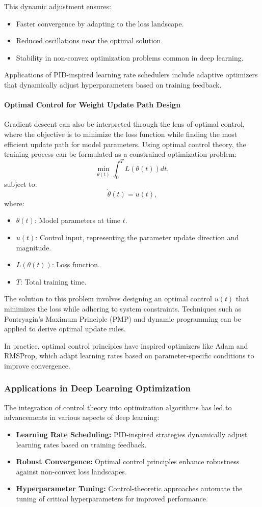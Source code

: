 \documentclass{IEEEojcsys}
\begin{document}
This dynamic adjustment ensures:
\begin{itemize}
    \item Faster convergence by adapting to the loss landscape.
    \item Reduced oscillations near the optimal solution.
    \item Stability in non-convex optimization problems common in deep learning.
\end{itemize}

Applications of PID-inspired learning rate schedulers include adaptive optimizers that dynamically adjust hyperparameters based on training feedback.

\paragraph{Optimal Control for Weight Update Path Design}
Gradient descent can also be interpreted through the lens of optimal control, where the objective is to minimize the loss function while finding the most efficient update path for model parameters. Using optimal control theory, the training process can be formulated as a constrained optimization problem:
\[
\min_{\theta(t)} \int_0^T L(\theta(t)) dt,
\]
subject to:
\[
\dot{\theta}(t) = u(t),
\]
where:
\begin{itemize}
    \item $\theta(t)$: Model parameters at time $t$.
    \item $u(t)$: Control input, representing the parameter update direction and magnitude.
    \item $L(\theta(t))$: Loss function.
    \item $T$: Total training time.
\end{itemize}

The solution to this problem involves designing an optimal control $u(t)$ that minimizes the loss while adhering to system constraints. Techniques such as Pontryagin's Maximum Principle (PMP) and dynamic programming can be applied to derive optimal update rules.

In practice, optimal control principles have inspired optimizers like Adam and RMSProp, which adapt learning rates based on parameter-specific conditions to improve convergence.

\subsubsection{Applications in Deep Learning Optimization}
The integration of control theory into optimization algorithms has led to advancements in various aspects of deep learning:
\begin{itemize}
    \item \textbf{Learning Rate Scheduling:} PID-inspired strategies dynamically adjust learning rates based on training feedback.
    \item \textbf{Robust Convergence:} Optimal control principles enhance robustness against non-convex loss landscapes.
    \item \textbf{Hyperparameter Tuning:} Control-theoretic approaches automate the tuning of critical hyperparameters for improved performance.
\end{itemize}
\end{document}
